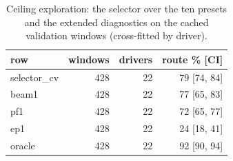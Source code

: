 \begin{table}[H]\centering\scriptsize\setlength{\tabcolsep}{3pt}
\caption{Ceiling exploration: the selector over the ten presets and the extended diagnostics on the cached validation windows (cross-fitted by driver).}\label{tab:supp_agent_sel_max}
\begin{tabular}{lrrr}\toprule
row & windows & drivers & route \% [CI] \\\midrule
selector\_cv & 428 & 22 & 79 [74, 84] \\
beam1 & 428 & 22 & 77 [65, 83] \\
pf1 & 428 & 22 & 72 [65, 77] \\
ep1 & 428 & 22 & 24 [18, 41] \\
oracle & 428 & 22 & 92 [90, 94] \\
\bottomrule\end{tabular}
\end{table}
